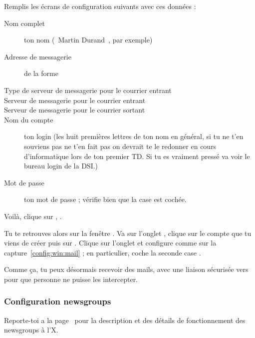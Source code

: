 
\setcounter{page}{12}

Remplis les écrans de configuration suivants avec ces données :
\begin{description}
  \item[Nom complet] ton nom (\guillemotleft~Martin Durand~\guillemotright , par exemple)
  \item[Adresse de messagerie] de la forme 
  \item[Type de serveur de messagerie pour le courrier entrant] 
  \item[Serveur de messagerie pour le courrier entrant] 
  \item[Serveur de messagerie pour le courrier sortant] 
  \item[Nom du compte] ton login  (les huit premières lettres de ton nom en général, si tu ne t'en souviens pas ne t'en fait pas on devrait te le redonner en cours d'informatique lors de ton premier TD. Si tu es vraiment pressé va voir le bureau login de la DSI.)
  \item[Mot de passe] ton mot de passe  ;
       vérifie bien que la case  est cochée.
\end{description}

Voilà, clique sur , .

Tu te retrouves alors sur la fenêtre . Va sur
l'onglet , clique sur le compte que tu viens de créer
puis sur . Clique sur l'onglet  et
configure comme sur la capture~\ref{config:win:mail} ; en
particulier, coche la seconde case .

Comme \c{c}a, tu peux désormais recevoir des mails, avec une liaison
sécurisée vers  pour que personne ne puisse les
intercepter.



\subsubsection{Configuration newsgroups}
Reporte-toi a la page~\pageref{newsgroups} pour la description et des détails de fonctionnement des newsgroups à l'X.

